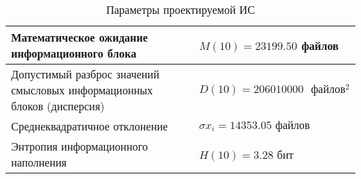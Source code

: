 \documentclass[a4paper,14pt]{extarticle}
\begin{document}
\begin{table}[h!]
	\centering
	\caption{Параметры проектируемой ИС}
	\begin{tabular}{|p{0.6\linewidth}|p{0.4\linewidth}|}
		\hline
		Математическое ожидание информационного блока & $M(10) = 23199.50$ файлов\\\hline
		Допустимый разброс значений смысловых
		 информационных блоков (дисперсия) & $D(10) = 206010000\mbox{ }файлов^2$ \\\hline
		 Среднеквадратичное отклонение & $\sigma x_i=14353.05\mbox{ файлов}$	\\\hline
		  Энтропия информационного наполнения & $H(10) = 3.28 $ бит \\\hline
	\end{tabular}
\end{table}
\end{document}
